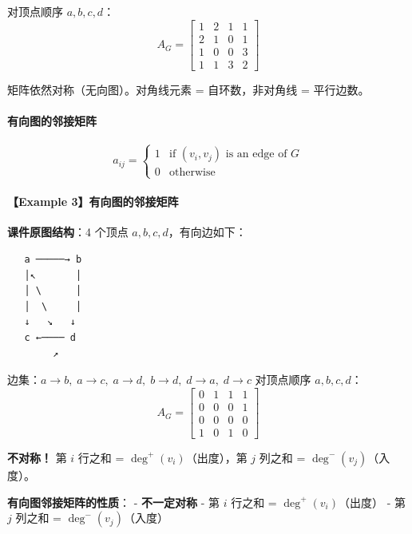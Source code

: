 \documentclass[10pt,a4paper,openany]{ctexbook}
\theoremstyle{definition}
\theoremstyle{remark}
\renewenvironment{quote}
  {\list{}{\leftmargin=1em\rightmargin=0pt\topsep=0.5pt\partopsep=0pt}\item[]}
  {\endlist}
\begin{document}
对顶点顺序 $a, b, c, d$：
\[
A_G =
\begin{bmatrix}
1 & 2 & 1 & 1 \\
2 & 1 & 0 & 1 \\
1 & 0 & 0 & 3 \\
1 & 1 & 3 & 2
\end{bmatrix}
\]

\begin{quote}
矩阵依然对称（无向图）。对角线元素 = 自环数，非对角线 = 平行边数。

\end{quote}

\paragraph{有向图的邻接矩阵}

\[
a_{ij} = 
\begin{cases}
1 & \text{if } (v_i, v_j) \text{ is an edge of } G \\
0 & \text{otherwise}
\end{cases}
\]

\paragraph{【Example 3】有向图的邻接矩阵}

\textbf{课件原图结构}：4 个顶点 $a, b, c, d$，有向边如下：
{\footnotesize\begin{verbatim}
   a ─────→ b
   │↖       │
   │ \      │
   │  \     │
   ↓   ↘   ↓
   c ←──── d
        ↗
\end{verbatim}}

边集：$a \to b,\; a \to c,\; a \to d,\; b \to d,\; d \to a,\; d \to c$
对顶点顺序 $a, b, c, d$：
\[
A_G =
\begin{bmatrix}
0 & 1 & 1 & 1 \\
0 & 0 & 0 & 1 \\
0 & 0 & 0 & 0 \\
1 & 0 & 1 & 0
\end{bmatrix}
\]

\begin{quote}
\textbf{不对称！} 第 $i$ 行之和 = $\deg^+(v_i)$（出度），第 $j$ 列之和 = $\deg^-(v_j)$（入度）。

\textbf{有向图邻接矩阵的性质}：
- \textbf{不一定对称}
- 第 $i$ 行之和 = $\deg^+(v_i)$（出度）
- 第 $j$ 列之和 = $\deg^-(v_j)$（入度）

\end{quote}
\end{document}
